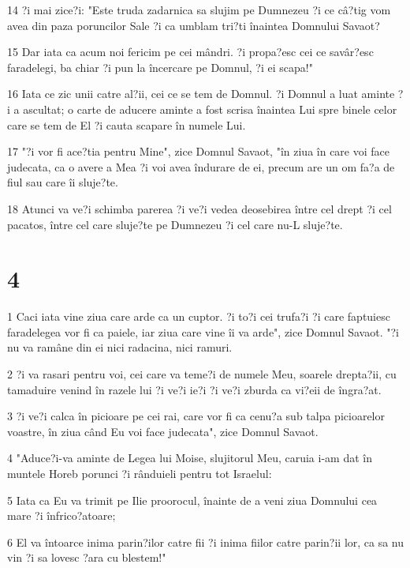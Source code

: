 \par 14 ?i mai zice?i: "Este truda zadarnica sa slujim pe Dumnezeu ?i ce câ?tig vom avea din paza poruncilor Sale ?i ca umblam tri?ti înaintea Domnului Savaot?
\par 15 Dar iata ca acum noi fericim pe cei mândri. ?i propa?esc cei ce savâr?esc faradelegi, ba chiar ?i pun la încercare pe Domnul, ?i ei scapa!"
\par 16 Iata ce zic unii catre al?ii, cei ce se tem de Domnul. ?i Domnul a luat aminte ?i a ascultat; o carte de aducere aminte a fost scrisa înaintea Lui spre binele celor care se tem de El ?i cauta scapare în numele Lui.
\par 17 "?i vor fi ace?tia pentru Mine", zice Domnul Savaot, "în ziua în care voi face judecata, ca o avere a Mea ?i voi avea îndurare de ei, precum are un om fa?a de fiul sau care îi sluje?te.
\par 18 Atunci va ve?i schimba parerea ?i ve?i vedea deosebirea între cel drept ?i cel pacatos, între cel care sluje?te pe Dumnezeu ?i cel care nu-L sluje?te.

\chapter{4}

\par 1 Caci iata vine ziua care arde ca un cuptor. ?i to?i cei trufa?i ?i care faptuiesc faradelegea vor fi ca paiele, iar ziua care vine îi va arde", zice Domnul Savaot. "?i nu va ramâne din ei nici radacina, nici ramuri.
\par 2 ?i va rasari pentru voi, cei care va teme?i de numele Meu, soarele drepta?ii, cu tamaduire venind în razele lui ?i ve?i ie?i ?i ve?i zburda ca vi?eii de îngra?at.
\par 3 ?i ve?i calca în picioare pe cei rai, care vor fi ca cenu?a sub talpa picioarelor voastre, în ziua când Eu voi face judecata", zice Domnul Savaot.
\par 4 "Aduce?i-va aminte de Legea lui Moise, slujitorul Meu, caruia i-am dat în muntele Horeb porunci ?i rânduieli pentru tot Israelul:
\par 5 Iata ca Eu va trimit pe Ilie proorocul, înainte de a veni ziua Domnului cea mare ?i înfrico?atoare;
\par 6 El va întoarce inima parin?ilor catre fii ?i inima fiilor catre parin?ii lor, ca sa nu vin ?i sa lovesc ?ara cu blestem!"


